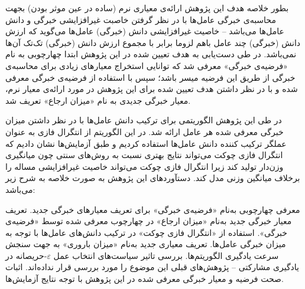 بطور خلاصه هدف این پژوهش ارائه‌ی معیاری نرم (ساده در عین موثر بودن) بجهت محاسبه‌ی خبرگی عامل‌ها با در نظر گرفتن خاصبت غیرافزایشی  خبرگی و دانش عامل‌ها می‌باشد -- خاصیت غیرافزایشی دانش (خبرگی) عامل‌ها می‌گوید که ارزش دانش (خبرگی) چند عامل باهم لزوما برابر با مجموع ارزش دانش (خبرگی) تک‌تک آن‌ها نمی‌باشد. در طی دست‌یابی به هدف تعیین شده در این پژوهش ابتدا چهارچوبی به نام «فرضیه‌ی خبرگی» معرفی شد که توانایی استخراج معیارهای زیادی برای محاسبه‌ی خبرگی از طریق این فرضیه میسر باشد؛ سپس با استفاده از فرضیه‌ی خبرگی معرفی شده و با در نظر داشتن هدف تعیین شده برای این پژوهش در مورد ارائه‌ی معیار نرم، معیار خبرگی جدیدی به نام «میزان ارجاع» تعریف شد.

در طی این پژوهش الگوریتمی برای ترکیب دانش‌ عامل‌ها با در نظر داشتن میزان خبرگی معرفی شده هر عامل ارائه شد. در این الگوریتم از انتگرال فازی به عنوان عملگر ترکیب کننده دانش عامل‌ها استفاده کردیم و طبق آزمایش‌ها نشان دادیم که انتگرال فازی چوکت می‌تواند نتایج بهتری نسبت به روش‌های سنتی چون میانگیری وزن‌دار تولید کند زیرا انتگرال فازی چوکت می‌تواند خاصیت غیرافزایشی مساله را برخلاف میانگین وزنی مدل کند. دستآورد‌های این پژوهش به صورت خلاصه  به شرح زیر می‌باشد:
\begin{itemize}\setlength\itemsep{-0.5em}
 معرفی چهارچوبی به‌نام «فرضیه‌ی خبرگی» برای تعریف معیارهای خبرگی جدید.
 تعریف معیار خبرگی جدید به‌نام «میزان ارجاع» در چهارچوب معرفی شده توسط «فرضیه‌ی خبرگی».
 استفاده از «انتگرال فازی چوکت» در ترکیب دانش‌های عامل‌ها با توجه به میزان خبرگی عامل‌ها.
 تعریف معیاری جدید به‌نام «میزان باروری» به جهت سنجش سرعت یادگیری الگوریتم‌ها.
 بررسی تاثیر سیاست‌های انتخاب عمل $\varepsilon$-حریصانه در یادگیری مشارکتی -- پژوهش‌های قبلی این موضوع را مورد بررسی قرار نداده‌اند.
 اثبات صحت فرضیه و معیار خبرگی معرفی شده در این پژوهش با توجه نتایج آزمایش‌ها.
\end{itemize}